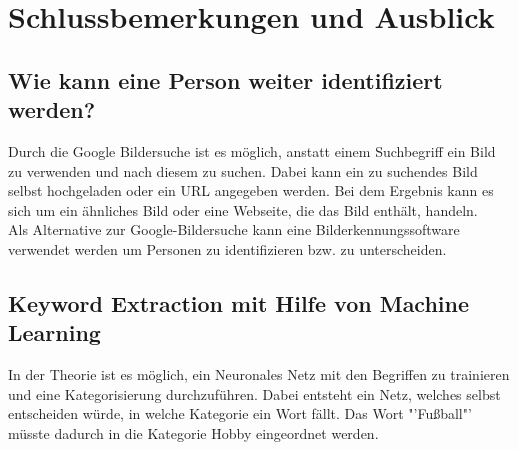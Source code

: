 \chapter{Schlussbemerkungen und Ausblick}
\label{chap:SchlussUndAusblick}
\section{Wie kann eine Person weiter identifiziert werden?}
Durch die Google Bildersuche ist es möglich, anstatt einem Suchbegriff ein Bild zu verwenden und nach diesem zu suchen. Dabei kann ein zu suchendes Bild selbst hochgeladen oder ein URL angegeben werden. Bei dem Ergebnis kann es sich um ein ähnliches Bild oder eine Webseite, die das Bild enthält, handeln.\\
Als Alternative zur Google-Bildersuche kann eine Bilderkennungssoftware verwendet werden um Personen zu identifizieren bzw. zu unterscheiden. %
\section{Keyword Extraction mit Hilfe von Machine Learning}
\label{sec:KeywordExtractionMachine Learning}
In der Theorie ist es möglich, ein Neuronales Netz mit den Begriffen zu trainieren und eine Kategorisierung durchzuführen. Dabei entsteht ein Netz, welches selbst entscheiden würde, in welche Kategorie ein Wort fällt. Das Wort "'Fußball"' müsste dadurch in die Kategorie Hobby eingeordnet werden.

